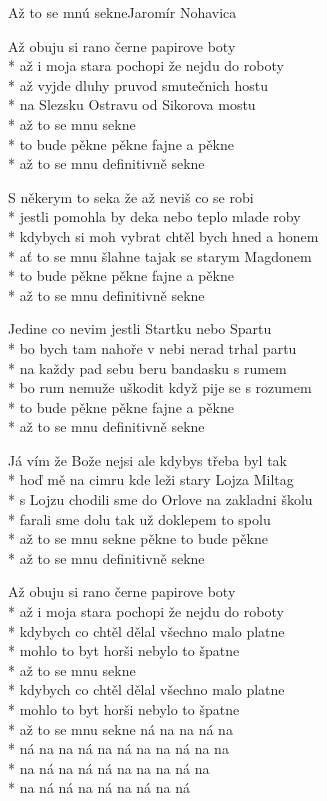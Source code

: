 \documentclass[10.5pt]{book}
\begin{document}
\begin{poem}{Až to se mnú sekne}{Jaromír Nohavica}

\settowidth{\versewidth}{s Lojzu chodili sme do Orlove na zakladni školu}

Až obuju si rano černe papirove boty\\*
až i moja stara pochopi že nejdu do roboty\\*
až vyjde dluhy pruvod smutečnich hostu\\*
na Slezsku Ostravu od Sikorova mostu\\*
až to se mnu sekne\\*
to bude pěkne pěkne fajne a pěkne\\*
až to se mnu definitivně sekne

S někerym to seka že až neviš co se robi\\*
jestli pomohla by deka nebo teplo mlade roby\\*
kdybych si moh vybrat chtěl bych hned a honem\\*
ať to se mnu šlahne tajak se starym Magdonem\\*
to bude pěkne pěkne fajne a pěkne\\*
až to se mnu definitivně sekne

Jedine co nevim jestli Startku nebo Spartu\\*
bo bych tam nahoře v nebi nerad trhal partu\\*
na každy pad sebu beru bandasku s rumem\\*
bo rum nemuže uškodit když pije se s rozumem\\*
to bude pěkne pěkne fajne a pěkne\\*
až to se mnu definitivně sekne

Já vím že Bože nejsi ale kdybys třeba byl tak\\*
hoď mě na cimru kde leži stary Lojza Miltag\\*
s Lojzu chodili sme do Orlove na zakladni školu\\*
farali sme dolu tak už doklepem to spolu\\*
až to se mnu sekne pěkne to bude pěkne\\*
až to se mnu definitivně sekne

Až obuju si rano černe papirove boty\\*
až i moja stara pochopi že nejdu do roboty\\*
kdybych co chtěl dělal všechno malo platne\\*
mohlo to byt horši nebylo to špatne\\*
až to se mnu sekne\\*
kdybych co chtěl dělal všechno malo platne\\*
mohlo to byt horši nebylo to špatne\\*
až to se mnu sekne ná na na ná na\\*
ná na na ná na ná na na ná na na\\*
na ná na ná ná na na na ná na\\*
na ná ná na ná na ná na ná

\end{poem}
\end{document}
